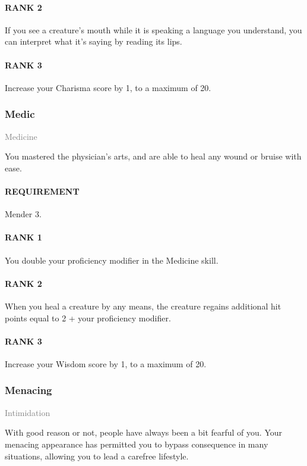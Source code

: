 \paragraph{RANK 2} If you see a creature's mouth while it is speaking a language you understand, you can interpret what it's saying by reading its lips.
\paragraph{RANK 3} Increase your Charisma score by 1, to a maximum of 20.

\subsubsection{Medic} \label{feat::medic}
\small{\textcolor{gray}{Medicine}}

\normalsize
You mastered the physician's arts, and are able to heal any wound or bruise with ease.
\paragraph{REQUIREMENT} Mender 3.
\paragraph{RANK 1} You double your proficiency modifier in the Medicine skill.
\paragraph{RANK 2} When you heal a creature by any means, the creature regains additional hit points equal to 2 + your proficiency modifier.
\paragraph{RANK 3} Increase your Wisdom score by 1, to a maximum of 20.

\subsubsection{Menacing} \label{feat::menacing}
\small{\textcolor{gray}{Intimidation}}

\normalsize
With good reason or not, people have always been a bit fearful of you.
Your menacing appearance has permitted you to bypass consequence in many situations, allowing you to lead a carefree lifestyle.
